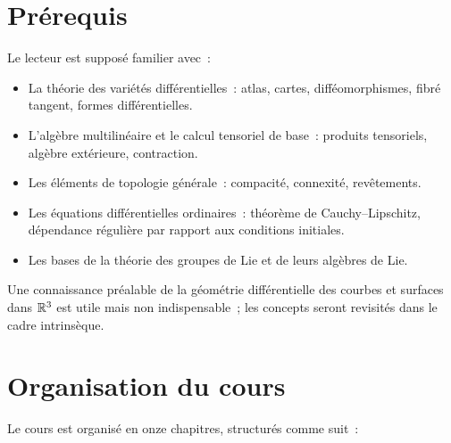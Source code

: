 \section*{Pr\'erequis}

Le lecteur est suppos\'e familier avec~:
\begin{itemize}
    \item La th\'eorie des vari\'et\'es diff\'erentielles~: atlas, cartes, diff\'eomorphismes,
          fibr\'e tangent, formes diff\'erentielles.
    \item L'alg\`ebre multilin\'eaire et le calcul tensoriel de base~: produits tensoriels,
          alg\`ebre ext\'erieure, contraction.
    \item Les \'el\'ements de topologie g\'en\'erale~: compacit\'e, connexit\'e, rev\^etements.
    \item Les \'equations diff\'erentielles ordinaires~: th\'eor\`eme de Cauchy--Lipschitz,
          d\'ependance r\'eguli\`ere par rapport aux conditions initiales.
    \item Les bases de la th\'eorie des groupes de Lie et de leurs alg\`ebres de Lie.
\end{itemize}

Une connaissance pr\'ealable de la g\'eom\'etrie diff\'erentielle des courbes et surfaces
dans $\mathbb{R}^3$ est utile mais non indispensable~; les concepts seront revisit\'es dans le
cadre intrins\`eque.

\section*{Organisation du cours}

Le cours est organis\'e en onze chapitres, structur\'es comme suit~:

